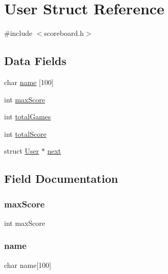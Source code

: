 \hypertarget{struct_user}{}\section{User Struct Reference}
\label{struct_user}


{\ttfamily \#include $<$scoreboard.\+h$>$}

\subsection*{Data Fields}
\begin{DoxyCompactItemize}
\item 
char \hyperlink{struct_user_aeaf846aa21a7d016a52f0b5b0c2f5544}{name} \mbox{[}100\mbox{]}
\item 
int \hyperlink{struct_user_a0c8d877e79d8d4704d4227d5ff196f38}{max\+Score}
\item 
int \hyperlink{struct_user_a184559da2c495bb82ca10df571e6e1ea}{total\+Games}
\item 
int \hyperlink{struct_user_ac7bd3550862b8c18bdd986250e1e89e9}{total\+Score}
\item 
struct \hyperlink{struct_user}{User} $\ast$ \hyperlink{struct_user_aac55e5c90c14ff9058a46a7174ed785c}{next}
\end{DoxyCompactItemize}


\subsection{Field Documentation}
\mbox{\label{struct_user_a0c8d877e79d8d4704d4227d5ff196f38}} 
\subsubsection{\texorpdfstring{max\+Score}{maxScore}}
{\footnotesize\ttfamily int max\+Score}

\mbox{\label{struct_user_aeaf846aa21a7d016a52f0b5b0c2f5544}} 
\subsubsection{\texorpdfstring{name}{name}}
{\footnotesize\ttfamily char name\mbox{[}100\mbox{]}}

\mbox{\label{struct_user_aac55e5c90c14ff9058a46a7174ed785c}} 
